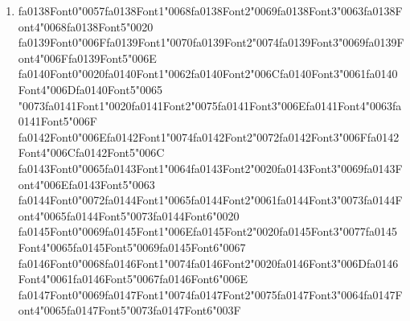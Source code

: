 \documentclass[12pt]{article}
\begin{document}
\begin{enumerate}[label=Q\arabic*.]
 \begin{enumerate}[label=(\Alph*)]
     \item Forcing sparse parameter updates
     \item Encouraging smaller weight magnitudes
     \item Reducing the number of layers in the network
     \item Eliminating bias terms
 \end{enumerate}
 
 \item {\csname fa0138Font0\endcsname\char"0057}{\csname fa0138Font1\endcsname\char"0068}{\csname fa0138Font2\endcsname\char"0069}{\csname fa0138Font3\endcsname\char"0063}{\csname fa0138Font4\endcsname\char"0068}{\csname fa0138Font5\endcsname\char"0020} {\csname fa0139Font0\endcsname\char"006F}{\csname fa0139Font1\endcsname\char"0070}{\csname fa0139Font2\endcsname\char"0074}{\csname fa0139Font3\endcsname\char"0069}{\csname fa0139Font4\endcsname\char"006F}{\csname fa0139Font5\endcsname\char"006E} {\csname fa0140Font0\endcsname\char"0020}{\csname fa0140Font1\endcsname\char"0062}{\csname fa0140Font2\endcsname\char"006C}{\csname fa0140Font3\endcsname\char"0061}{\csname fa0140Font4\endcsname\char"006D}{\csname fa0140Font5\endcsname\char"0065} {\char"0073}{\csname fa0141Font1\endcsname\char"0020}{\csname fa0141Font2\endcsname\char"0075}{\csname fa0141Font3\endcsname\char"006E}{\csname fa0141Font4\endcsname\char"0063}{\csname fa0141Font5\endcsname\char"006F} {\csname fa0142Font0\endcsname\char"006E}{\csname fa0142Font1\endcsname\char"0074}{\csname fa0142Font2\endcsname\char"0072}{\csname fa0142Font3\endcsname\char"006F}{\csname fa0142Font4\endcsname\char"006C}{\csname fa0142Font5\endcsname\char"006C} {\csname fa0143Font0\endcsname\char"0065}{\csname fa0143Font1\endcsname\char"0064}{\csname fa0143Font2\endcsname\char"0020}{\csname fa0143Font3\endcsname\char"0069}{\csname fa0143Font4\endcsname\char"006E}{\csname fa0143Font5\endcsname\char"0063} {\csname fa0144Font0\endcsname\char"0072}{\csname fa0144Font1\endcsname\char"0065}{\csname fa0144Font2\endcsname\char"0061}{\csname fa0144Font3\endcsname\char"0073}{\csname fa0144Font4\endcsname\char"0065}{\csname fa0144Font5\endcsname\char"0073}{\csname fa0144Font6\endcsname\char"0020} {\csname fa0145Font0\endcsname\char"0069}{\csname fa0145Font1\endcsname\char"006E}{\csname fa0145Font2\endcsname\char"0020}{\csname fa0145Font3\endcsname\char"0077}{\csname fa0145Font4\endcsname\char"0065}{\csname fa0145Font5\endcsname\char"0069}{\csname fa0145Font6\endcsname\char"0067} {\csname fa0146Font0\endcsname\char"0068}{\csname fa0146Font1\endcsname\char"0074}{\csname fa0146Font2\endcsname\char"0020}{\csname fa0146Font3\endcsname\char"006D}{\csname fa0146Font4\endcsname\char"0061}{\csname fa0146Font5\endcsname\char"0067}{\csname fa0146Font6\endcsname\char"006E} {\csname fa0147Font0\endcsname\char"0069}{\csname fa0147Font1\endcsname\char"0074}{\csname fa0147Font2\endcsname\char"0075}{\csname fa0147Font3\endcsname\char"0064}{\csname fa0147Font4\endcsname\char"0065}{\csname fa0147Font5\endcsname\char"0073}{\csname fa0147Font6\endcsname\char"003F}

\end{enumerate}
\end{document}
